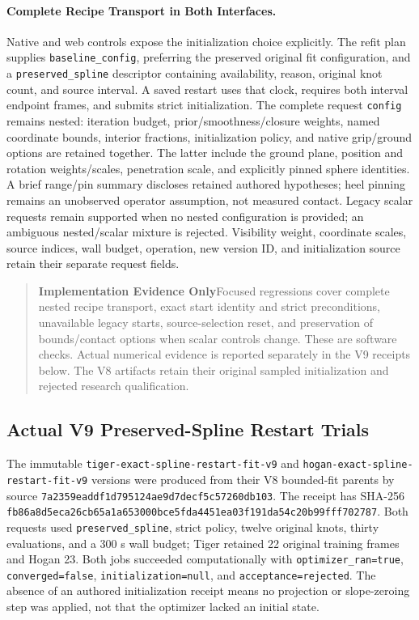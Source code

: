 \documentclass[11pt,letterpaper]{article}
\newcommand{\code}[1]{\nolinkurl{#1}}
\newcommand{\hash}[1]{{\footnotesize\nolinkurl{#1}}}
\newcommand{\note}[2]{\begin{quote}\textcolor{accent}{\textbf{#1}}\quad #2\end{quote}}
\begin{document}
\paragraph{Complete Recipe Transport in Both Interfaces.}
Native and web controls expose the initialization choice explicitly. The
refit plan supplies \code{baseline_config}, preferring the preserved original
fit configuration, and a \code{preserved_spline} descriptor containing
availability, reason, original knot count, and source interval. A saved
restart uses that clock, requires both interval endpoint frames, and submits
strict initialization. The complete request \code{config} remains nested:
iteration budget, prior/smoothness/closure weights, named coordinate bounds,
interior fractions, initialization policy, and native grip/ground options
are retained together. The latter include the ground plane, position and
rotation weights/scales, penetration scale, and explicitly pinned sphere
identities. A brief range/pin summary discloses retained authored hypotheses;
heel pinning remains an unobserved operator assumption, not measured contact.
Legacy scalar requests remain supported when no nested configuration is
provided; an ambiguous nested/scalar mixture is rejected. Visibility weight,
coordinate scales, source indices, wall budget, operation, new version ID,
and initialization source retain their separate request fields.

\note{Implementation Evidence Only}{Focused regressions cover complete nested
recipe transport, exact start identity and strict preconditions, unavailable
legacy starts, source-selection reset, and preservation of bounds/contact
options when scalar controls change. These are software checks. Actual
numerical evidence is reported separately in the V9 receipts below. The V8
artifacts retain their original sampled initialization and rejected research
qualification.}

\subsection{Actual V9 Preserved-Spline Restart Trials}
The immutable \code{tiger-exact-spline-restart-fit-v9} and
\code{hogan-exact-spline-restart-fit-v9} versions were produced from their V8
bounded-fit parents by source
\hash{7a2359eaddf1d795124ae9d7decf5c57260db103}.
The receipt  has SHA-256
\hash{fb86a8d5eca26cb65a1a653000bce5fda4451ea03f191da54c20b99fff702787}.
Both requests used \code{preserved_spline}, strict policy, twelve original
knots, thirty evaluations, and a 300 s wall budget; Tiger retained 22 original
training frames and Hogan 23. Both jobs succeeded computationally with
\code{optimizer_ran=true}, \code{converged=false},
\code{initialization=null}, and \code{acceptance=rejected}.
The absence of an authored initialization receipt means no projection or
slope-zeroing step was applied, not that the optimizer lacked an initial state.
\end{document}
